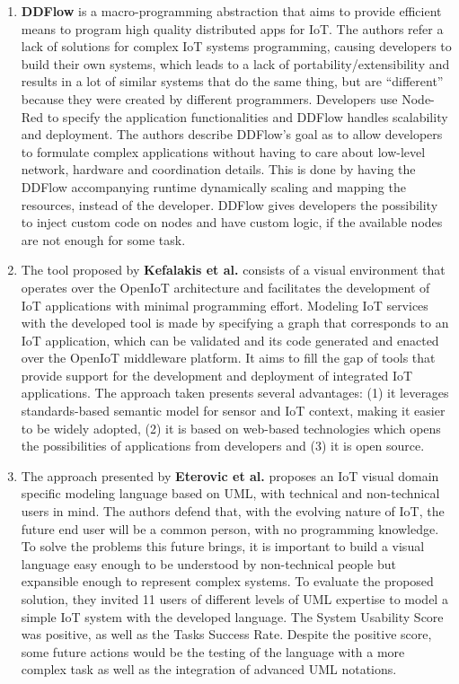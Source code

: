 \begin{enumerate}
    \item \textbf{DDFlow} \cite{ddflow} is a macro-programming abstraction that aims to provide efficient means to program high quality distributed apps for IoT.
    The authors refer a lack of solutions for complex IoT systems programming, causing developers to build their own systems, which leads to a lack of portability/extensibility and results in a lot of similar systems that do the same thing, but are “different” because they were created by different programmers. Developers use Node-Red to specify the application functionalities and DDFlow handles scalability and deployment. The authors describe DDFlow's goal as to allow developers to formulate complex applications without having to care about low-level network, hardware and coordination details. This is done by having the DDFlow accompanying runtime dynamically scaling and mapping the resources, instead of the developer. DDFlow gives developers the possibility to inject custom code on nodes and have custom logic, if the available nodes are not enough for some task.
    \item The tool proposed by \textbf{Kefalakis et al.} \cite{visual_paradigm_iot_solutions_development} consists of a visual environment that operates over the OpenIoT architecture and facilitates the development of IoT applications with minimal programming effort. Modeling IoT services with the developed tool is made by specifying a graph that corresponds to an IoT application, which can be validated and its code generated and enacted over the OpenIoT middleware platform. It aims to fill the gap of tools that provide support for the development and deployment of integrated IoT applications. The approach taken presents several advantages: (1) it leverages standards-based semantic model for sensor and IoT context, making it easier to be widely adopted, (2) it is based on web-based technologies which opens the possibilities of applications from developers and (3) it is open source. 
    \item The approach presented by \textbf{Eterovic et al.} \cite{vpl_uml} proposes an IoT visual domain specific modeling language based on UML, with technical and non-technical users in mind. The authors defend that, with the evolving nature of IoT, the future end user will be a common person, with no programming knowledge. To solve the problems this future brings, it is important to build a visual language easy enough to be understood by non-technical people but expansible enough to represent complex systems. To evaluate the proposed solution, they invited 11 users of different levels of UML expertise to model a simple IoT system with the developed language. The System Usability Score was positive, as well as the Tasks Success Rate. Despite the positive score, some future actions would be the testing of the language with a more complex task as well as the integration of advanced UML notations.

\end{enumerate}
